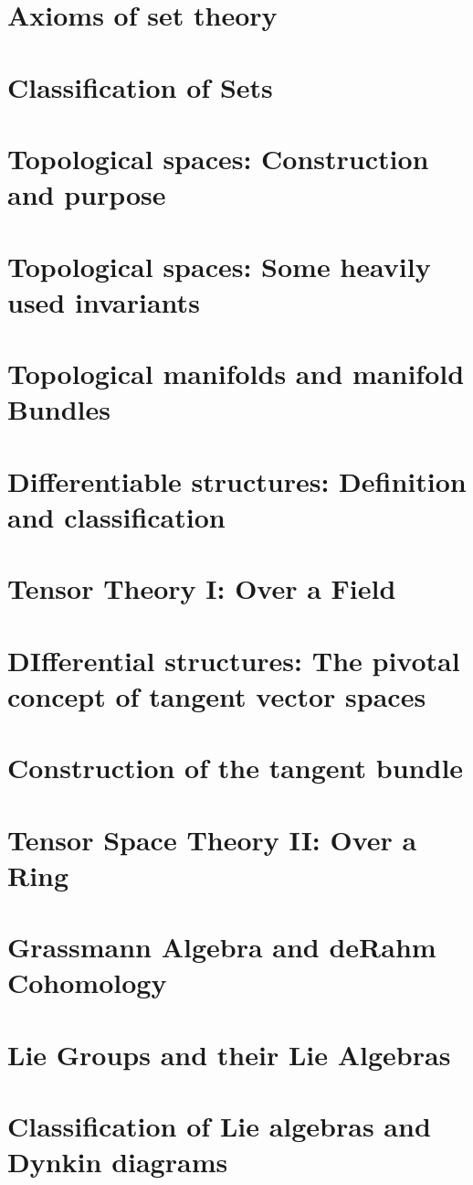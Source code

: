 \documentclass{article}
\begin{document}
\section{Axioms of set theory}
\section{Classification of Sets}
\section{Topological spaces: Construction and purpose}
\section{Topological spaces: Some heavily used invariants}
\section{Topological manifolds and manifold Bundles}
\section{Differentiable structures: Definition and classification}
\section{Tensor Theory I: Over a Field}
\section{DIfferential structures: The pivotal concept of tangent vector spaces}
\section{Construction of the tangent bundle}
\section{Tensor Space Theory II: Over a Ring}
\section{Grassmann Algebra and deRahm Cohomology}
\section{Lie Groups and their Lie Algebras}
\section{Classification of Lie algebras and Dynkin diagrams}
\end{document}
